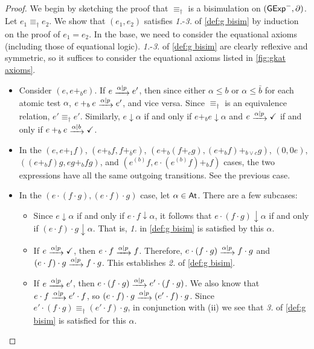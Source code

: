 \documentclass[orivec,envcountsect,envcountsame]{llncs}
\begin{document}
\thmsoundness*

\begin{proof}
	We begin by sketching the proof that \(\equiv_\dagger\) is a bisimulation on \((\mathsf{GExp}^-, \partial)\).
	Let \(e_1 \equiv_\dagger e_2\).
	We show that \((e_1, e_2)\) satisfies \emph{1.}-\emph{3.} of \cref{def:g bisim} by induction on the proof of \(e_1 = e_2\).
	In the base, we need to consider the equational axioms (including those of equational logic).
	\emph{1.}-\emph{3.} of \cref{def:g bisim} are clearly reflexive and symmetric, so it suffices to consider the equational axioms listed in \cref{fig:gkat axioms}.
	\begin{itemize}
		\item Consider \((e, e +_b e)\).
		If \(e \tr{\alpha \mid p} e'\), then since either \(\alpha \le b\) or \(\alpha \le \bar b\) for each atomic test \(\alpha\), \(e +_b e \tr{\alpha \mid p} e'\), and vice versa.
		Since \(\equiv_\dagger\) is an equivalence relation, \(e' \equiv_\dagger e'\).
		Similarly, \(e \downarrow \alpha\) if and only if \(e +_b e\downarrow \alpha\) and \(e \tr{\alpha \mid p} \checkmark\) if and only if \(e +_b e \tr{\alpha \mid b} \checkmark\).
		\item In the \((e, e +_1 f)\), \((e +_b f, f +_{\bar b} e)\), \((e +_b (f +_c g), (e +_b f) +_{b\vee c} g)\), \((0, 0e)\), \(((e +_b f)g, eg +_b fg)\), and \((e^{(b)}f, e\cdot (e^{(b)}f) +_{b} f)\) cases, the two expressions have all the same outgoing transitions. See the previous case.
		\item In the \((e\cdot (f\cdot g), (e\cdot f)\cdot g)\) case, let \(\alpha \in \mathsf{At}\).
		There are a few subcases:
		\begin{itemize}
			\item[(i)] Since \(e \downarrow \alpha\) if and only if \(e\cdot f \downarrow \alpha\), it follows that \(e \cdot (f \cdot g) \downarrow \alpha\) if and only if \((e\cdot f) \cdot g \downarrow \alpha\). That is, \emph{1.} in \cref{def:g bisim} is satisfied by this \(\alpha\).
			\item[(ii)] If \(e \tr{\alpha \mid p}\checkmark\), then \(e \cdot f \tr{\alpha \mid p} f\). Therefore, \(e\cdot (f \cdot g) \tr{\alpha\mid p} f \cdot g\) and \((e \cdot f)\cdot g \tr{\alpha \mid p} f \cdot g\).
            This establishes \emph{2.} of \cref{def:g bisim}.
			\item[(iii)] If \(e \tr{\alpha \mid p} e'\), then \(e\cdot (f\cdot g) \tr{\alpha \mid p} e'\cdot (f\cdot g)\). We also know that \(e\cdot f \tr{\alpha \mid p} e'\cdot f\), so \((e\cdot f)\cdot g\tr{\alpha \mid p} (e'\cdot f)\cdot g\). Since \(e'\cdot (f\cdot g) \equiv_\dagger (e'\cdot f)\cdot g\), in conjunction with (ii) we see that \emph{3.} of \cref{def:g bisim} is satisfied for this \(\alpha\).

\end{itemize}
\end{itemize}
\end{proof}
\end{document}
